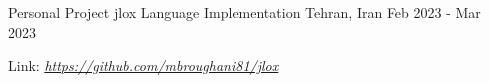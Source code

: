 \begin{cventries}
  \cventry
  {Personal Project} %
  {jlox Language Implementation} %
  {Tehran, Iran} %
  {Feb 2023 - Mar 2023} %
  {
    \begin{cvitems} %
    \item {Link: \href{https://github.com/mbroughani81/jlox}{\textit{https://github.com/mbroughani81/jlox}}}
    \end{cvitems}
  }


\end{cventries}

